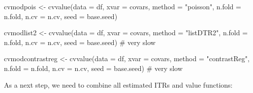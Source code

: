 \documentclass[
  letterpaper,
  DIV=11,
  numbers=noendperiod]{scrreprt}
\newenvironment{Shaded}{\begin{snugshade}}{\end{snugshade}}
\newcommand{\AttributeTok}[1]{\textcolor[rgb]{0.40,0.45,0.13}{#1}}
\newcommand{\CommentTok}[1]{\textcolor[rgb]{0.37,0.37,0.37}{#1}}
\newcommand{\FunctionTok}[1]{\textcolor[rgb]{0.28,0.35,0.67}{#1}}
\newcommand{\NormalTok}[1]{\textcolor[rgb]{0.00,0.23,0.31}{#1}}
\newcommand{\OtherTok}[1]{\textcolor[rgb]{0.00,0.23,0.31}{#1}}
\newcommand{\StringTok}[1]{\textcolor[rgb]{0.13,0.47,0.30}{#1}}
\begin{document}
\begin{Shaded}
\begin{Highlighting}[]
\NormalTok{cvmodpois }\OtherTok{\textless{}{-}} \FunctionTok{cvvalue}\NormalTok{(}\AttributeTok{data =}\NormalTok{ df, }\AttributeTok{xvar =}\NormalTok{ covars,}
                     \AttributeTok{method =} \StringTok{"poisson"}\NormalTok{, }\AttributeTok{n.fold =}\NormalTok{ n.fold, }\AttributeTok{n.cv =}\NormalTok{ n.cv, }
                     \AttributeTok{seed =}\NormalTok{ base.seed)}

\NormalTok{cvmodlist2 }\OtherTok{\textless{}{-}} \FunctionTok{cvvalue}\NormalTok{(}\AttributeTok{data =}\NormalTok{ df, }\AttributeTok{xvar =}\NormalTok{ covars,}
                      \AttributeTok{method =} \StringTok{"listDTR2"}\NormalTok{, }\AttributeTok{n.fold =}\NormalTok{ n.fold, }\AttributeTok{n.cv =}\NormalTok{ n.cv, }
                      \AttributeTok{seed =}\NormalTok{ base.seed) }\CommentTok{\# very slow}

\NormalTok{cvmodcontrastreg }\OtherTok{\textless{}{-}} \FunctionTok{cvvalue}\NormalTok{(}\AttributeTok{data =}\NormalTok{ df, }\AttributeTok{xvar =}\NormalTok{ covars,}
                            \AttributeTok{method =} \StringTok{"contrastReg"}\NormalTok{, }\AttributeTok{n.fold =}\NormalTok{ n.fold, }
                            \AttributeTok{n.cv =}\NormalTok{ n.cv, }
                            \AttributeTok{seed =}\NormalTok{ base.seed) }\CommentTok{\# very slow}
\end{Highlighting}
\end{Shaded}

As a next step, we need to combine all estimated ITRs and value
functions:
\end{document}
